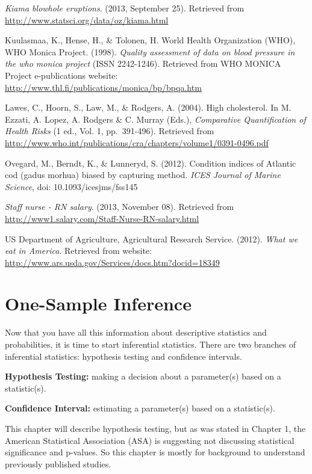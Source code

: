 \documentclass[
]{book}
\begin{document}
\emph{Kiama blowhole eruptions}. (2013, September 25). Retrieved from
\url{http://www.statsci.org/data/oz/kiama.html}

Kuulasmaa, K., Hense, H., \& Tolonen, H. World Health Organization (WHO),
WHO Monica Project. (1998). \emph{Quality assessment of data on blood
pressure in the who monica project} (ISSN 2242-1246). Retrieved from WHO
MONICA Project e-publications website:
\url{http://www.thl.fi/publications/monica/bp/bpqa.htm}

Lawes, C., Hoorn, S., Law, M., \& Rodgers, A. (2004). High cholesterol.
In M. Ezzati, A. Lopez, A. Rodgers \& C. Murray (Eds.), \emph{Comparative
Quantification of Health Risks} (1 ed., Vol. 1, pp.~391-496). Retrieved
from
\url{http://www.who.int/publications/cra/chapters/volume1/0391-0496.pdf}

Ovegard, M., Berndt, K., \& Lunneryd, S. (2012). Condition indices of
Atlantic cod (gadus morhua) biased by capturing method. \emph{ICES Journal of
Marine Science}, doi: 10.1093/icesjms/fss145

\emph{Staff nurse - RN salary}. (2013, November 08). Retrieved from
\url{http://www1.salary.com/Staff-Nurse-RN-salary.html}

US Department of Agriculture, Agricultural Research Service. (2012).
\emph{What we eat in America}. Retrieved from website:
\url{http://www.ars.usda.gov/Services/docs.htm?docid=18349}

\hypertarget{one-sample-inference}{%
\chapter{One-Sample Inference}\label{one-sample-inference}}

Now that you have all this information about descriptive statistics and probabilities, it is time to start inferential statistics. There are two branches of inferential statistics: hypothesis testing and confidence intervals.

\textbf{Hypothesis Testing:} making a decision about a parameter(s) based on a statistic(s).

\textbf{Confidence Interval:} estimating a parameter(s) based on a statistic(s).

This chapter will describe hypothesis testing, but as was stated in Chapter 1, the American Statistical Association (ASA) is suggesting not discussing statistical significance and p-values. So this chapter is mostly for background to understand previously published studies.
\end{document}
